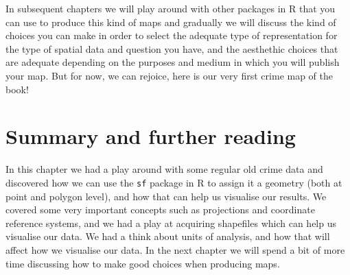 \documentclass[
]{book}
\begin{document}
In subsequent chapters we will play around with other packages in R that you can use to produce this kind of maps and gradually we will discuss the kind of choices you can make in order to select the adequate type of representation for the type of spatial data and question you have, and the aesthethic choices that are adequate depending on the purposes and medium in which you will publish your map. But for now, we can rejoice, here is our very first crime map of the book!

\hypertarget{summary-and-further-reading}{%
\section{Summary and further reading}\label{summary-and-further-reading}}

In this chapter we had a play around with some regular old crime data and discovered how we can use the \texttt{sf} package in R to assign it a geometry (both at point and polygon level), and how that can help us visualise our results. We covered some very important concepts such as projections and coordinate reference systems, and we had a play at acquiring shapefiles which can help us visualise our data. We had a think about units of analysis, and how that will affect how we visualise our data. In the next chapter we will spend a bit of more time discussing how to make good choices when producing maps.
\end{document}
